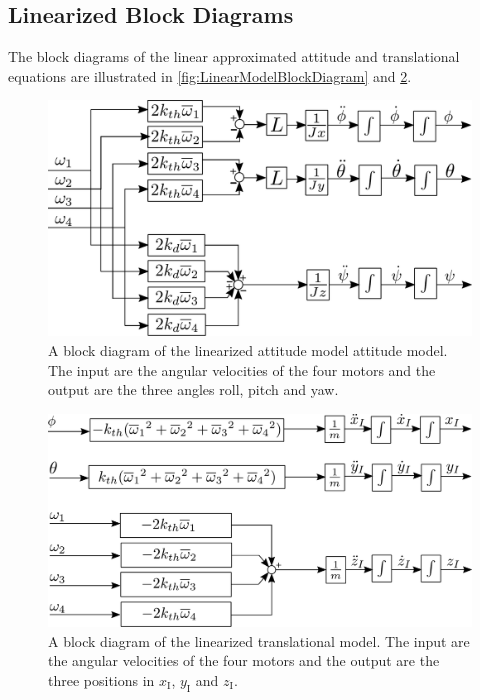 \subsection{Linearized Block Diagrams}
The block diagrams of the linear approximated attitude and translational equations are illustrated in \autoref{fig:LinearModelBlockDiagram} and \ref{fig:TranslationalLinearModelBlockDiagram}.
\begin{figure}[H]
	\centering
	\includegraphics[scale=0.45]{figures/LinearModelBlockDiag.pdf}
	\caption{A block diagram of the linearized attitude model attitude model. The input are the angular velocities of the four motors and the output are the three angles roll, pitch and yaw.}
	\label{fig:LinearModelBlockDiagram}
\end{figure}
\begin{figure}[H]
	\centering
	\includegraphics[scale=0.45]{figures/TranslationalLinearModelBlockDiagram.pdf}
	\caption{A block diagram of the linearized translational model. The input are the angular velocities of the four motors and the output are the three positions in $x_{\mathrm{I}}$, $y_{\mathrm{I}}$ and $z_{\mathrm{I}}$.}
	\label{fig:TranslationalLinearModelBlockDiagram}
\end{figure}

